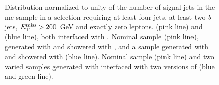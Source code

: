 \begin{figure}[htb]
\centering 
{}
\caption{Distribution normalized to unity of the number of signal jets in the \ttbar \gls{mc} sample in a selection requiring at least four jets, at least two \textit{b}-jets, $E_{\rm T}^{\mathrm{miss}}>200$ GeV and exactly zero leptons. 
 \PowhegBox (pink line) and \aNLO (blue line), both interfaced with \HWpp.
 Nominal sample (pink line), generated with \PowhegBox and showered with \PY, and a sample generated with \PowhegBox and showered with \HWpp (blue line).
 Nominal sample (pink line) and two varied samples generated with \PowhegBox interfaced with two versions of \PY (blue and green line).
}\label{fig:ttbar_nj_0L_syst}
\end{figure}

